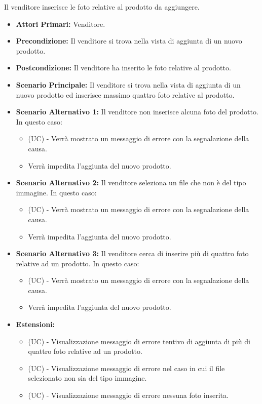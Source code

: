 Il venditore inserisce le foto relative al prodotto da aggiungere.
\begin{itemize}
    \item \textbf{Attori Primari:} Venditore.
    \item \textbf{Precondizione:} Il venditore si trova nella vista di aggiunta di un nuovo prodotto.
    \item \textbf{Postcondizione:} Il venditore ha inserito le foto relative al prodotto.
    \item \textbf{Scenario Principale:} Il venditore si trova nella vista di aggiunta di un nuovo prodotto ed inserisce massimo quattro foto relative al prodotto.
    \item \textbf{Scenario Alternativo 1:} Il venditore non inserisce alcuna foto del prodotto. In questo caso:
    \begin{itemize}
        \item (UC) - Verrà mostrato un messaggio di errore con la segnalazione della causa.
        \item Verrà impedita l'aggiunta del nuovo prodotto.
    \end{itemize}
    \item \textbf{Scenario Alternativo 2:} Il venditore seleziona un file che non è del tipo immagine. In questo caso:
    \begin{itemize}
        \item (UC) - Verrà mostrato un messaggio di errore con la segnalazione della causa.
        \item Verrà impedita l'aggiunta del nuovo prodotto.
    \end{itemize}
    \item \textbf{Scenario Alternativo 3:} Il venditore cerca di inserire più di quattro foto relative ad un prodotto. In questo caso:
    \begin{itemize}
        \item (UC) - Verrà mostrato un messaggio di errore con la segnalazione della causa.
        \item Verrà impedita l'aggiunta del nuovo prodotto.
    \end{itemize}
    \item \textbf{Estensioni:}
    \begin{itemize}
        \item (UC) - Visualizzazione messaggio di errore tentivo di aggiunta di più di quattro foto relative ad un prodotto.
        \item (UC) - Visualizzazione messaggio di errore nel caso in cui il file selezionato non sia del tipo immagine.
        \item (UC) - Visualizzazione messaggio di errore nessuna foto inserita.
    \end{itemize}
\end{itemize}

